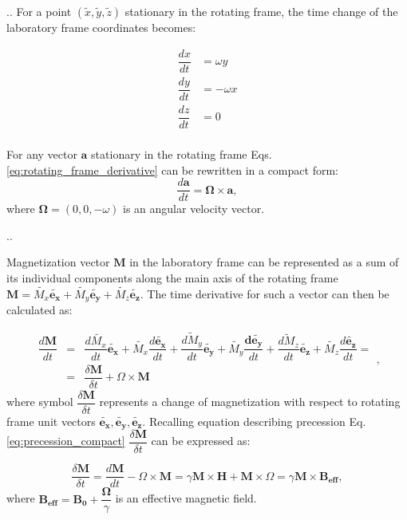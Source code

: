 \documentclass{beamer}
\begin{document}
\begin{frame}{\thesection.\thesubsection. \insertsubsection}For a point $(\tilde{x},\tilde{y},\tilde{z})$ stationary in the rotating frame, the time change of the laboratory frame coordinates becomes:
 
 \begin{equation} \label{eq:rotating_frame_derivative}
 \begin{array}{lcl}
 \dfrac{dx}{dt} &= \omega {y}  \\
 \dfrac{dy}{dt} &= -\omega {x}  \\
 \dfrac{dz}{dt} &= 0  \\
 \end{array}
 \end{equation} 
 
 For any vector $\bm{a}$ stationary in the rotating frame Eqs.\ref{eq:rotating_frame_derivative} can be rewritten in a compact form:
 \begin{equation}
 \dfrac{d\bm{a}}{dt} = \bm{\Omega} \times \bm{a},
 \end{equation}
 where $\bm{\Omega} = (0,0, -\omega)$ is an angular velocity vector.


\end{frame}
\begin{frame}[shrink=5]{\thesection.\thesubsection. \insertsubsection}

 Magnetization vector $\bm{M}$ in the laboratory frame can be represented as a sum of its individual components along the main axis of the rotating frame $\bm{M} = \tilde{M_x} \bm{\tilde{e_x}} + \tilde{M_y} \bm{\tilde{e_y}}+ \tilde{M_z} \bm{\tilde{e_z}}$.  The time derivative for such a vector can then be calculated as:
 
 \begin{equation}
 \begin{array} {lcl}
 \dfrac{d\bm{M}}{dt} &=& \dfrac{d\tilde{M_x}}{dt} \bm{\tilde{e_x}} + \tilde{M_x} \dfrac{d\bm{\tilde{e_x}}}{dt} + \dfrac{\tilde{dM_y}}{dt} \bm{\tilde{e_y}} + \tilde{M_y} \dfrac{\bm{d\tilde{e_y}}}{dt} + \dfrac{\tilde{dM_z}}{dt} \bm{\tilde{e_z}} + \tilde{M_z} \dfrac{d\bm{\tilde{e_z}}}{dt} = \\
 &=& \dfrac{\delta \bm{M}}{\delta t} + \Omega \times \bm{M}
 \end{array},
 \end{equation}
 where symbol $\dfrac{\delta \bm{M}}{\delta t}$ represents a change of magnetization with respect to rotating frame unit vectors $\bm{\tilde{e_x}}, \bm{\tilde{e_y}}, \bm{\tilde{e_z}}$. Recalling equation describing precession  Eq.\ref{eq:precession_compact}  $\dfrac{\delta \bm{M}}{\delta t}$ can be expressed as:

 \begin{equation}
 \dfrac{\delta \bm{M}}{\delta t} = \dfrac{d\bm{M}}{dt} - \Omega \times \bm{M} = \gamma \bm{M} \times \bm{H} + \bm{M} \times \Omega = \gamma \bm{M} \times \bm{B_{eff}},
 \end{equation}
 where  $\bm {B_{eff}} = \bm{B_0} + \dfrac{\bm {\Omega}}{\gamma}$ is an effective magnetic field. 


\end{frame}
\end{document}
